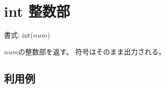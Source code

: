 
%

\section{int 整数部\label{sect:int}}

書式: int($num$)

$num$の整数部を返す。
符号はそのまま出力される。

\subsection*{利用例}


%

